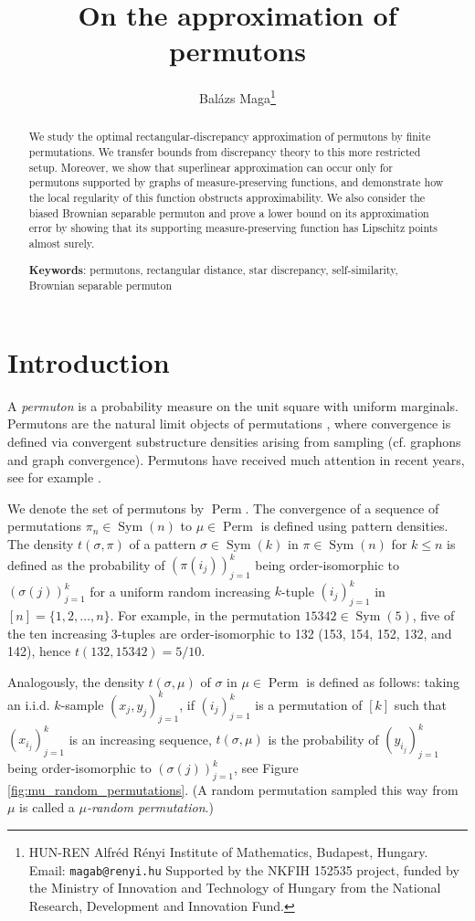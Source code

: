 \documentclass{article}
\title{On the approximation of permutons}
\author{Bal\'azs Maga\thanks{HUN-REN Alfréd Rényi Institute of Mathematics, Budapest, Hungary. Email: \texttt{magab@renyi.hu}
\newline Supported by the NKFIH 152535 project, funded by the Ministry of Innovation and Technology of Hungary from the National Research, Development and Innovation Fund.}}
\date{}
\newcommand{\Perm}{\mathop{\mathrm{Perm}}}
\newcommand{\Sym}{\mathop{\mathrm{Sym}}}
\theoremstyle{definition}
\begin{document}
\maketitle
\begin{abstract}
We study the optimal rectangular-discrepancy approximation of permutons by finite permutations. We transfer bounds from discrepancy theory to this more restricted setup. Moreover, we show that superlinear approximation can occur only for permutons supported by graphs of measure-preserving functions, and demonstrate how the local regularity of this function obstructs approximability. We also consider the biased Brownian separable permuton and prove a lower bound on its approximation error by showing that its supporting measure-preserving function has Lipschitz points almost surely.

\noindent \textbf{Keywords}: permutons, rectangular distance, star discrepancy, self-similarity, Brownian separable permuton
\end{abstract}

\section{Introduction}

A \emph{permuton} is a probability measure on the unit square with uniform marginals. Permutons are the natural limit objects of permutations \cite{HOPPEN201393}, where convergence is defined via convergent substructure densities arising from sampling (cf. graphons and graph convergence). Permutons have received much attention in recent years, see for example \cite{BASSINO2022108513, BorgaGwynneSun2025PermutonsMeandersLQG, Bouvel_Nicaud_Pivoteau_2026}.

We denote the set of permutons by $\Perm$. The convergence of a sequence of permutations $\pi_n\in \Sym(n)$ to $\mu\in\Perm$ is defined using pattern densities. The density $t(\sigma, \pi)$ of a pattern $\sigma\in \Sym(k)$ in $\pi\in \Sym(n)$ for $k\leq n$ is defined as the probability of $(\pi(i_j))_{j=1}^{k}$ being order-isomorphic to $(\sigma(j))_{j=1}^{k}$ for a uniform random increasing $k$-tuple $(i_j)_{j=1}^{k}$ in $[n]=\{1, 2, \dots, n\}$. For example, in the permutation $15342\in \Sym(5)$, five of the ten increasing 3-tuples  are order-isomorphic to 132 (153, 154, 152, 132, and 142), hence $t(132, 15342)=5/10.$

Analogously, the density $t(\sigma, \mu)$ of $\sigma$ in $\mu\in \Perm$ is defined as follows: taking an i.i.d. $k$-sample $(x_j, y_j)_{j=1}^{k}$, if $(i_j)_{j=1}^{k}$ is a permutation of $[k]$ such that $(x_{i_j})_{j=1}^{k}$ is an increasing sequence, $t(\sigma, \mu)$ is the probability of $(y_{i_j})_{j=1}^{k}$ being order-isomorphic to $(\sigma(j))_{j=1}^{k}$, see Figure \ref{fig:mu_random_permutations}. (A random permutation sampled this way from $\mu$ is called a \emph{$\mu$-random permutation}.) 
\end{document}
